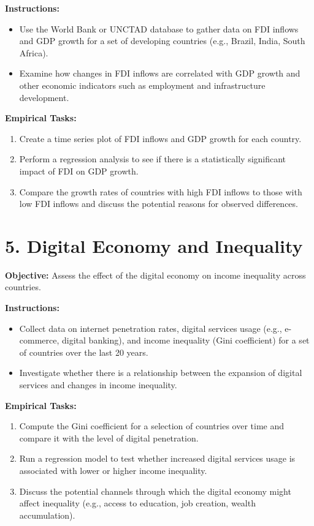 \documentclass{article}
\begin{document}
\textbf{Instructions:}
\begin{itemize}
    \item Use the World Bank or UNCTAD database to gather data on FDI inflows and GDP growth for a set of developing countries (e.g., Brazil, India, South Africa).
    \item Examine how changes in FDI inflows are correlated with GDP growth and other economic indicators such as employment and infrastructure development.
\end{itemize}

\textbf{Empirical Tasks:}
\begin{enumerate}
    \item Create a time series plot of FDI inflows and GDP growth for each country.
    \item Perform a regression analysis to see if there is a statistically significant impact of FDI on GDP growth.
    \item Compare the growth rates of countries with high FDI inflows to those with low FDI inflows and discuss the potential reasons for observed differences.
\end{enumerate}

\section*{5. Digital Economy and Inequality}
\textbf{Objective:} Assess the effect of the digital economy on income inequality across countries.

\textbf{Instructions:}
\begin{itemize}
    \item Collect data on internet penetration rates, digital services usage (e.g., e-commerce, digital banking), and income inequality (Gini coefficient) for a set of countries over the last 20 years.
    \item Investigate whether there is a relationship between the expansion of digital services and changes in income inequality.
\end{itemize}

\textbf{Empirical Tasks:}
\begin{enumerate}
    \item Compute the Gini coefficient for a selection of countries over time and compare it with the level of digital penetration.
    \item Run a regression model to test whether increased digital services usage is associated with lower or higher income inequality.
    \item Discuss the potential channels through which the digital economy might affect inequality (e.g., access to education, job creation, wealth accumulation).
\end{enumerate}
\end{document}
